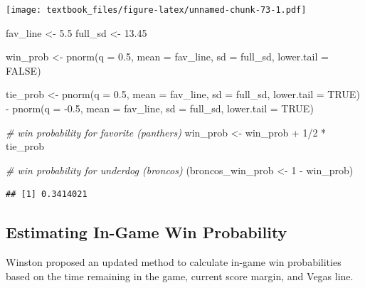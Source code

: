 \documentclass[
  11pt,
]{book}
\newenvironment{Shaded}{\begin{snugshade}}{\end{snugshade}}
\newcommand{\AttributeTok}[1]{\textcolor[rgb]{0.77,0.63,0.00}{#1}}
\newcommand{\CommentTok}[1]{\textcolor[rgb]{0.56,0.35,0.01}{\textit{#1}}}
\newcommand{\ConstantTok}[1]{\textcolor[rgb]{0.00,0.00,0.00}{#1}}
\newcommand{\DecValTok}[1]{\textcolor[rgb]{0.00,0.00,0.81}{#1}}
\newcommand{\FloatTok}[1]{\textcolor[rgb]{0.00,0.00,0.81}{#1}}
\newcommand{\FunctionTok}[1]{\textcolor[rgb]{0.00,0.00,0.00}{#1}}
\newcommand{\NormalTok}[1]{#1}
\newcommand{\OtherTok}[1]{\textcolor[rgb]{0.56,0.35,0.01}{#1}}
\newcommand{\SpecialCharTok}[1]{\textcolor[rgb]{0.00,0.00,0.00}{#1}}
\theoremstyle{definition}
\theoremstyle{definition}
\theoremstyle{definition}
\theoremstyle{definition}
\theoremstyle{remark}
\begin{document}
\texttt{[image: textbook\_files/figure-latex/unnamed-chunk-73-1.pdf]}

\vfill

\begin{Shaded}
\begin{Highlighting}[]
\NormalTok{fav\_line }\OtherTok{\textless{}{-}} \FloatTok{5.5}
\NormalTok{full\_sd }\OtherTok{\textless{}{-}} \FloatTok{13.45}

\NormalTok{win\_prob }\OtherTok{\textless{}{-}} \FunctionTok{pnorm}\NormalTok{(}\AttributeTok{q =} \FloatTok{0.5}\NormalTok{, }\AttributeTok{mean =}\NormalTok{ fav\_line, }\AttributeTok{sd =}\NormalTok{ full\_sd, }\AttributeTok{lower.tail =} \ConstantTok{FALSE}\NormalTok{)}

\NormalTok{tie\_prob }\OtherTok{\textless{}{-}} \FunctionTok{pnorm}\NormalTok{(}\AttributeTok{q =} \FloatTok{0.5}\NormalTok{, }\AttributeTok{mean =}\NormalTok{ fav\_line, }\AttributeTok{sd =}\NormalTok{ full\_sd, }\AttributeTok{lower.tail =} \ConstantTok{TRUE}\NormalTok{) }\SpecialCharTok{{-}}
            \FunctionTok{pnorm}\NormalTok{(}\AttributeTok{q =} \SpecialCharTok{{-}}\FloatTok{0.5}\NormalTok{, }\AttributeTok{mean =}\NormalTok{ fav\_line, }\AttributeTok{sd =}\NormalTok{ full\_sd, }\AttributeTok{lower.tail =} \ConstantTok{TRUE}\NormalTok{)}

\CommentTok{\# win probability for favorite (panthers)}
\NormalTok{win\_prob }\OtherTok{\textless{}{-}}\NormalTok{ win\_prob }\SpecialCharTok{+} \DecValTok{1}\SpecialCharTok{/}\DecValTok{2} \SpecialCharTok{*}\NormalTok{ tie\_prob}

\CommentTok{\# win probability for underdog (broncos)}
\NormalTok{(broncos\_win\_prob }\OtherTok{\textless{}{-}} \DecValTok{1} \SpecialCharTok{{-}}\NormalTok{ win\_prob)}
\end{Highlighting}
\end{Shaded}

\begin{verbatim}
## [1] 0.3414021
\end{verbatim}

\newpage

\hypertarget{estimating-in-game-win-probability}{%
\subsection{Estimating In-Game Win Probability}\label{estimating-in-game-win-probability}}

Winston proposed an updated method to calculate in-game win probabilities based on the time remaining in the game, current score margin, and Vegas line.
\end{document}
